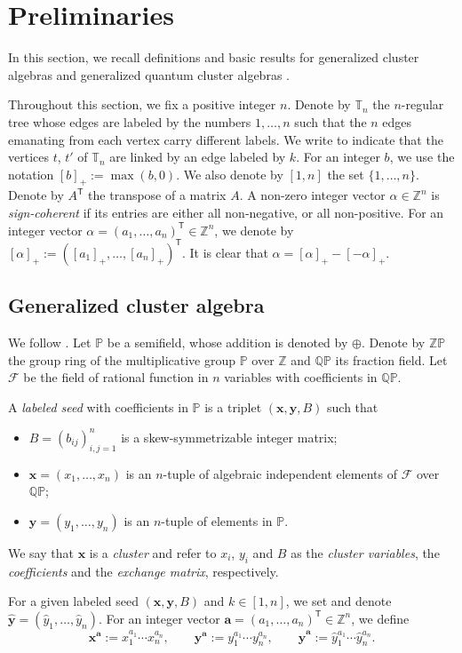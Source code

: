 \documentclass[11pt]{article}
\numberwithin{equation}{section}
\newcommand{\Z}{\mathbb{Z}}
\numberwithin{equation}{section}
\begin{document}
 \section{Preliminaries}\label{Preliminaries}
 In this section, we recall definitions and basic results for generalized cluster algebras \cite{Chekhov_Shapiro} and generalized quantum cluster algebras \cite{BCDX2018}.

 Throughout this section, we fix a positive integer $n$. Denote by $\mathbb{T}_n$ the $n$-regular tree whose edges are labeled by the numbers $1,\dots,n$ such that the $n$ edges emanating from each vertex carry different labels. We write
  to indicate that the vertices $t$, $t'$ of $\mathbb{T}_n$ are linked by an edge labeled by $k$.
For an integer $b$, we use the notation $[b]_+:=\max(b,0)$. We also denote by $[1,n]$ the set $\{1,\dots,n\}$. Denote by $A^{\mathsf T}$ the transpose of a matrix $A$. A non-zero integer vector $\alpha\in \Z^n$ is {\it sign-coherent} if its entries are either all non-negative, or all non-positive.
For an integer vector $\alpha=(a_1,\dots,a_n)^{\mathsf T}\in\mathbb{Z}^n$, we denote by $[\alpha]_+:=([a_1]_+,\dots,[a_n]_+)^{\mathsf T}$. It is clear that $\alpha=[\alpha]_+-[-\alpha]_+$.

\subsection{Generalized cluster algebra}\label{S2}
 We follow \cite{Nakanishi14}.
Let $\mathbb{P}$ be a semifield, whose addition is denoted by $\oplus$. Denote by $\mathbb{ZP}$ the group ring of the multiplicative group $\mathbb{P}$ over $\mathbb{Z}$ and $\mathbb{QP}$ its fraction field. Let
$\mathcal{F}$ be the field of rational function in $n$ variables with coefficients in $\mathbb{QP}$.

\begin{Definition}\label{D4}
 A {\it labeled seed} with coefficients in $\mathbb{P}$ is a triplet $(\mathbf{x},\mathbf{y},B)$ such that
 \begin{itemize}\itemsep=0pt
 \item $B=(b_{ij})_{i,j=1}^{n}$ is a skew-symmetrizable integer matrix;
 \item $\mathbf{x}=(x_1,\dots,x_n)$ is an $n$-tuple of algebraic independent elements of $\mathcal{F}$ over $\mathbb{QP}$;
 \item $\mathbf{y}=(y_1,\dots,y_n)$ is an $n$-tuple of elements in $\mathbb{P}$.

 \end{itemize}
We say that $\mathbf{x}$ is a {\it cluster} and refer to $x_i$, $y_i$ and $B$ as the {\it cluster variables}, the {\it coefficients}
and the {\it exchange matrix}, respectively.
\end{Definition}
For a given labeled seed $(\mathbf{x},\mathbf{y},B)$ and $k\in [1,n]$, we set
and denote ${\hat{\mathbf{y}}=(\hat{y}_1,\dots, \hat{y}_n)}$. For an integer vector $\mathbf{a}=(a_1,\dots, a_n)^{\mathsf T}\in \Z^n$, we define
\[
\mathbf{x}^\mathbf{a}:=x_1^{a_1}\cdots x_n^{a_n},\qquad \mathbf{y}^\mathbf{a}:=y_1^{a_1}\cdots y_n^{a_n},\qquad \hat{\mathbf{y}}^\mathbf{a}:=\hat{y}_1^{a_1}\cdots \hat{y}_n^{a_n}.
\]
\end{document}
